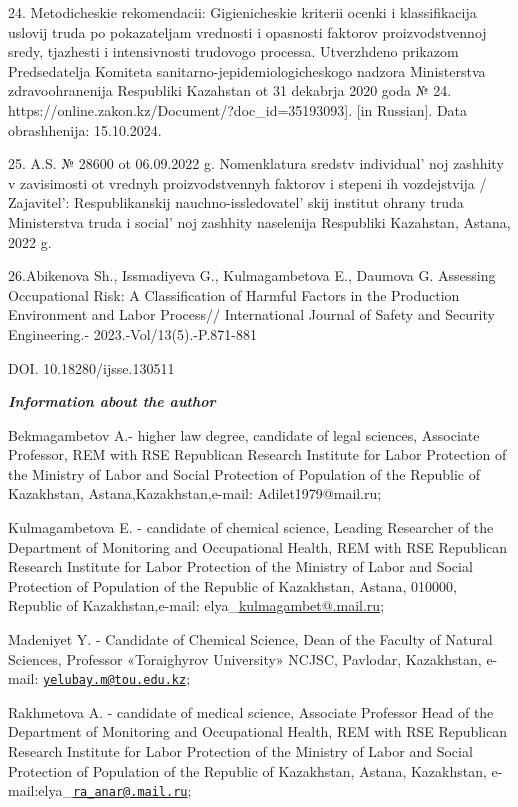 {24. Metodicheskie rekomendacii: Gigienicheskie kriterii ocenki i
klassifikacija uslovij truda po pokazateljam vrednosti i opasnosti
faktorov proizvodstvennoj sredy, tjazhesti i intensivnosti trudovogo
processa. Utverzhdeno prikazom Predsedatelja Komiteta
sanitarno-jepidemiologicheskogo nadzora Ministerstva zdravoohranenija
Respubliki Kazahstan ot 31 dekabrja 2020 goda № 24.
https://online.zakon.kz/Document/?doc\_id=35193093{]}. {[}in Russian{]}.
Data obrashhenija: 15.10.2024.

25. A.S. № 28600 ot 06.09.2022 g. Nomenklatura sredstv
individual' noj zashhity v zavisimosti ot vrednyh
proizvodstvennyh faktorov i stepeni ih vozdejstvija /
Zajavitel': Respublikanskij
nauchno-issledovatel' skij institut ohrany truda
Ministerstva truda i social' noj zashhity naselenija
Respubliki Kazahstan, Astana, 2022 g.

26.Abikenova Sh., Issmadiyeva G., Kulmagambetova E., Daumova G.
Assessing Occupational Risk: A Classification of Harmful Factors in the
Production Environment and Labor Process// International Journal of
Safety and Security Engineering.- 2023.-Vol/13(5).-P.871-881

DOI. 10.18280/ijsse.130511

\emph{{\bfseries Information about the author}}

Bekmagambetov A.- higher law degree, candidate of legal sciences,
Associate Professor, REM with RSE Republican Research Institute for
Labor Protection of the Ministry of Labor and Social Protection of
Population of the Republic of Kazakhstan, Astana,Kazakhstan,e-mail:
Adilet1979@mail.ru;

Kulmagambetova E. - candidate of chemical science, Leading Researcher of
the Department of Monitoring and Occupational Health, REM with RSE
Republican Research Institute for Labor Protection of the Ministry of
Labor and Social Protection of Population of the Republic of Kazakhstan,
Astana, 010000, Republic of Kazakhstan,e-mail:
elya\_\href{mailto:kulmagambet@.mail.ruedu.kz}{kulmagambet@.mail.ru};

Madeniyet Y. - Candidate of Chemical Science, Dean of the Faculty of
Natural Sciences, Professor «Toraighyrov University» NCJSC, Pavlodar,
Kazakhstan, e-mail:
\href{mailto:yelubay.m@tou.edu.kz}{\nolinkurl{yelubay.m@tou.edu.kz}};

Rakhmetova A. - candidate of medical science, Associate Professor Head
of the Department of Monitoring and Occupational Health, REM with RSE
Republican Research Institute for Labor Protection of the Ministry of
Labor and Social Protection of Population of the Republic of Kazakhstan,
Astana, Kazakhstan,
e-mail:elya\_\href{mailto:ra_anar@.mail.ru}{\nolinkurl{ra\_anar@.mail.ru}};

}
